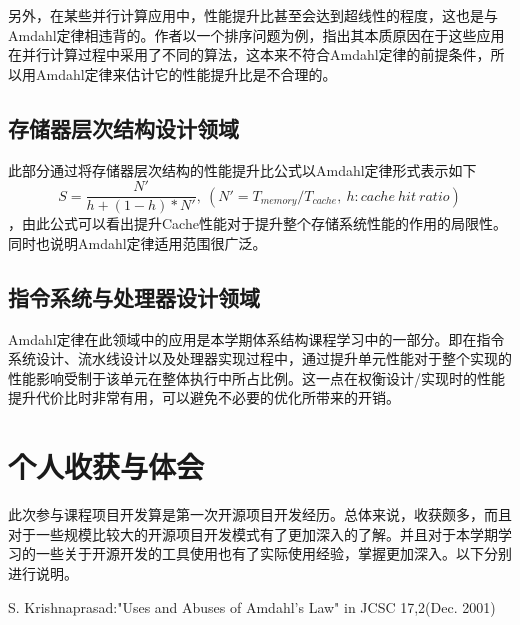 \documentclass[a4paper,12pt]{article}
\begin{document}
\begin{CJK*}{UTF8}{song}
		另外，在某些并行计算应用中，性能提升比甚至会达到超线性的程度，这也是与Amdahl定律相违背的。作者以一个排序问题为例，指出其本质原因在于这些应用在并行计算过程中采用了不同的算法，这本来不符合Amdahl定律的前提条件，所以用Amdahl定律来估计它的性能提升比是不合理的。

		\subsection{存储器层次结构设计领域}
		\linespread{1.1}此部分通过将存储器层次结构的性能提升比公式以Amdahl定律形式表示如下\begin{displaymath}S=\frac{N'}{h+(1-h)*N'},\ (N'=T_{memory}/T_{cache},\ h:cache\ hit\ ratio)\end{displaymath}，由此公式可以看出提升Cache性能对于提升整个存储系统性能的作用的局限性。同时也说明Amdahl定律适用范围很广泛。

		\subsection{指令系统与处理器设计领域}
		\linespread{1.1}Amdahl定律在此领域中的应用是本学期体系结构课程学习中的一部分。即在指令系统设计、流水线设计以及处理器实现过程中，通过提升单元性能对于整个实现的性能影响受制于该单元在整体执行中所占比例。这一点在权衡设计/实现时的性能提升代价比时非常有用，可以避免不必要的优化所带来的开销。

	\section{\large{个人收获与体会}}
	\linespread{1.1}此次参与课程项目开发算是第一次开源项目开发经历。总体来说，收获颇多，而且对于一些规模比较大的开源项目开发模式有了更加深入的了解。并且对于本学期学习的一些关于开源开发的工具使用也有了实际使用经验，掌握更加深入。以下分别进行说明。

	\begin{thebibliography}{99}

			S. Krishnaprasad:"Uses and Abuses of Amdahl's Law" in JCSC 17,2(Dec. 2001)
	\end{thebibliography}

\end{CJK*}
\end{document}
